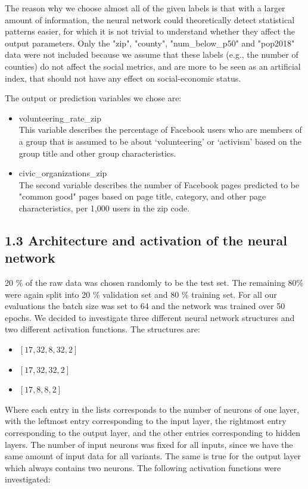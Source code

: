The reason why we choose almost all of the given labels is that with a larger amount of information, the neural network could theoretically detect statistical patterns easier, for which it is not trivial to understand whether they affect the output parameters. Only the "zip", "county", "num\_below\_p50" and "pop2018" data were not included because we assume that these labels (e.g., the number of counties) do not affect the social metrics, and are more to be seen as an artificial index, that should not have any effect on social-economic status.

The output or prediction variables we chose are:
\begin{itemize}
  \item volunteering\_rate\_zip
  \\This variable describes the percentage of Facebook users who are members of a group that is assumed to be about ‘volunteering’ or ‘activism’ based on the group title and other group characteristics.
  \item civic\_organizations\_zip
  \\The second variable describes the number of Facebook pages predicted to be "common good" pages based on page title, category, and other page characteristics, per 1,000 users in the zip code.
\end{itemize}

\subsection*{1.3 Architecture and activation of the neural network}
20 \% of the raw data was chosen randomly to be the test set. The remaining 80\% were again split into 20 \% validation set and 80 \% training set. 
For all our evaluations the batch size was set to 64 and the network was trained over 50 epochs. We decided to investigate three different neural network structures and two different activation functions. The structures are: 
\begin{itemize}
 \item $[17, 32, 8, 32, 2]$
 \item $[17, 32, 32, 2]$
 \item $[17, 8, 8, 2]$
\end{itemize}

Where each entry in the lists corresponds to the number of neurons of one layer, with the leftmost entry corresponding to the input layer, the rightmost entry corresponding to the output layer, and the other entries corresponding to hidden layers.
The number of input neurons was fixed for all inputs, since we have the same amount of input data for all variants. The same is true for the output layer which always contains two neurons. 
The following activation functions were investigated:

